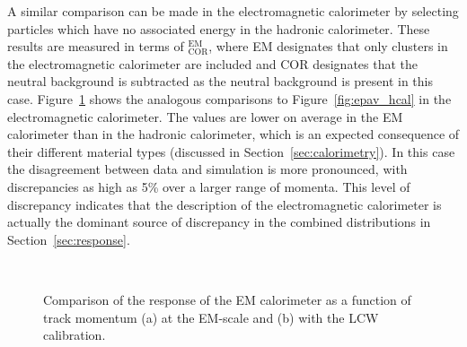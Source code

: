 A similar comparison can be made in the electromagnetic calorimeter by selecting particles which have no associated energy in the hadronic calorimeter. 
These results are measured in terms of \epav$_{\mathrm{COR}}^{\mathrm{EM}}$, where EM designates that only clusters in the electromagnetic calorimeter are included and COR designates that the neutral background is subtracted as the neutral background is present in this case.
Figure~\ref{fig:epcor_ecal} shows the analogous comparisons to Figure~\ref{fig:epav_hcal} in the electromagnetic calorimeter.
The \epcor values are lower on average in the \ac{EM} calorimeter than in the hadronic calorimeter, which is an expected consequence of their different material types (discussed in Section~\ref{sec:calorimetry}). 
In this case the disagreement between data and simulation is more pronounced, with discrepancies as high as 5\% over a larger range of momenta.
This level of discrepancy indicates that the description of the electromagnetic calorimeter is actually the dominant source of discrepancy in the combined distributions in Section~\ref{sec:response}. 

\begin{figure}[htbp]
\centering
{}
~
\caption{Comparison of the response of the EM calorimeter as a function of track momentum (a) at the EM-scale and (b) with the LCW calibration.}
\label{fig:epcor_ecal}
\end{figure}

